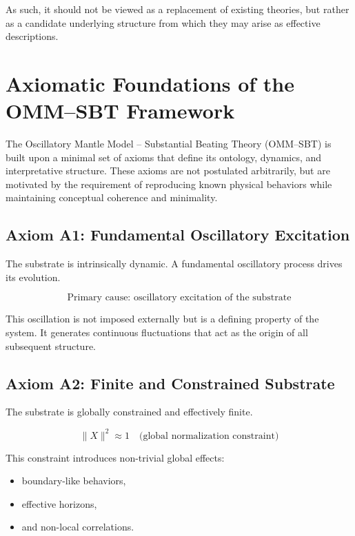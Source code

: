 \documentclass[11pt]{article}
\begin{document}
As such, it should not be viewed as a replacement of existing theories, but rather as a candidate underlying structure from which they may arise as effective descriptions.

\section{Axiomatic Foundations of the OMM--SBT Framework}

The Oscillatory Mantle Model -- Substantial Beating Theory (OMM--SBT) is built upon a minimal set of axioms that define its ontology, dynamics, and interpretative structure. These axioms are not postulated arbitrarily, but are motivated by the requirement of reproducing known physical behaviors while maintaining conceptual coherence and minimality.

\subsection{Axiom A1: Fundamental Oscillatory Excitation}

The substrate is intrinsically dynamic. A fundamental oscillatory process drives its evolution.

\begin{equation}
\text{Primary cause: oscillatory excitation of the substrate}
\end{equation}

This oscillation is not imposed externally but is a defining property of the system. It generates continuous fluctuations that act as the origin of all subsequent structure.

\subsection{Axiom A2: Finite and Constrained Substrate}

The substrate is globally constrained and effectively finite.

\begin{equation}
\|X\|^2 \approx 1 \quad \text{(global normalization constraint)}
\end{equation}

This constraint introduces non-trivial global effects:
\begin{itemize}
\item boundary-like behaviors,
\item effective horizons,
\item and non-local correlations.
\end{itemize}
\end{document}
